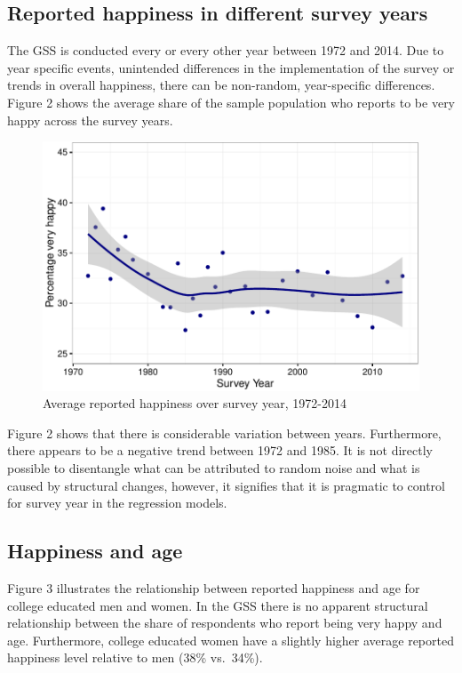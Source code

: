 \documentclass[]{article}
\begin{document}
\subsection{Reported happiness in different survey
years}\label{reported-happiness-in-different-survey-years}

The GSS is conducted every or every other year between 1972 and 2014.
Due to year specific events, unintended differences in the
implementation of the survey or trends in overall happiness, there can
be non-random, year-specific differences. Figure 2 shows the average
share of the sample population who reports to be very happy across the
survey years.

\begin{figure}[htbp]
\centering
\includegraphics{Final_Project_P-P_analysis_Unger_files/figure-latex/unnamed-chunk-4-1.pdf}
\caption{Average reported happiness over survey year, 1972-2014}
\end{figure}

Figure 2 shows that there is considerable variation between years.
Furthermore, there appears to be a negative trend between 1972 and 1985.
It is not directly possible to disentangle what can be attributed to
random noise and what is caused by structural changes, however, it
signifies that it is pragmatic to control for survey year in the
regression models.

\subsection{Happiness and age}\label{happiness-and-age}

Figure 3 illustrates the relationship between reported happiness and age
for college educated men and women. In the GSS there is no apparent
structural relationship between the share of respondents who report
being very happy and age. Furthermore, college educated women have a
slightly higher average reported happiness level relative to men (38\%
vs.~34\%).
\end{document}
